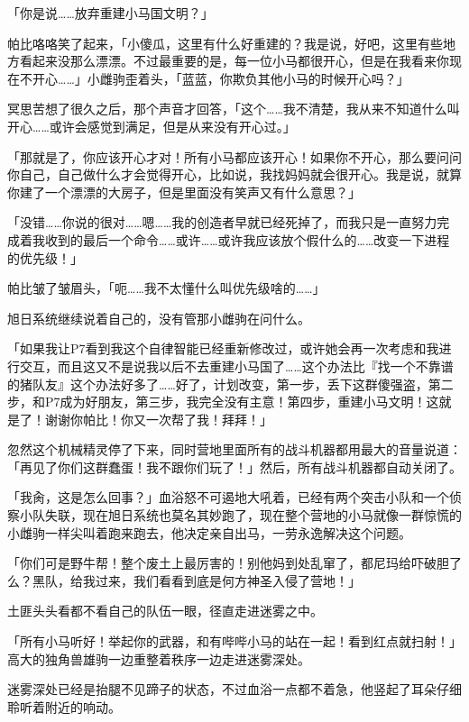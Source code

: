 「你是说……放弃重建小马国文明？」

帕比咯咯笑了起来，「小傻瓜，这里有什么好重建的？我是说，好吧，这里有些地方看起来没那么漂漂。不过最重要的是，每一位小马都很开心，但是在我看来你现在不开心……」小雌驹歪着头，「蓝蓝，你欺负其他小马的时候开心吗？」

冥思苦想了很久之后，那个声音才回答，「这个……我不清楚，我从来不知道什么叫开心……或许会感觉到满足，但是从来没有开心过。」

「那就是了，你应该开心才对！所有小马都应该开心！如果你不开心，那么要问问你自己，自己做什么才会觉得开心，比如说，我找妈妈就会很开心。我是说，就算你建了一个漂漂的大房子，但是里面没有笑声又有什么意思？」

「没错……你说的很对……嗯……我的创造者早就已经死掉了，而我只是一直努力完成着我收到的最后一个命令……或许……或许我应该放个假什么的……改变一下进程的优先级！」

帕比皱了皱眉头，「呃……我不太懂什么叫优先级啥的……」

旭日系统继续说着自己的，没有管那小雌驹在问什么。

「如果我让P7看到我这个自律智能已经重新修改过，或许她会再一次考虑和我进行交互，而且这又不是说我以后不去重建小马国了……这个办法比『找一个不靠谱的猪队友』这个办法好多了……好了，计划改变，第一步，丢下这群傻强盗，第二步，和P7成为好朋友，第三步，我完全没有主意！第四步，重建小马文明！这就是了！谢谢你帕比！你又一次帮了我！拜拜！」

忽然这个机械精灵停了下来，同时营地里面所有的战斗机器都用最大的音量说道：「再见了你们这群蠢蛋！我不跟你们玩了！」然后，所有战斗机器都自动关闭了。

\horizonline


「我肏，这是怎么回事？」血浴怒不可遏地大吼着，已经有两个突击小队和一个侦察小队失联，现在旭日系统也莫名其妙跑了，现在整个营地的小马就像一群惊慌的小雌驹一样尖叫着跑来跑去，他决定亲自出马，一劳永逸解决这个问题。

「你们可是野牛帮！整个废土上最厉害的！别他妈到处乱窜了，都尼玛给吓破胆了么？黑队，给我过来，我们看看到底是何方神圣入侵了营地！」

土匪头头看都不看自己的队伍一眼，径直走进迷雾之中。

「所有小马听好！举起你的武器，和有哔哔小马的站在一起！看到红点就扫射！」高大的独角兽雄驹一边重整着秩序一边走进迷雾深处。

迷雾深处已经是抬腿不见蹄子的状态，不过血浴一点都不着急，他竖起了耳朵仔细聆听着附近的响动。

